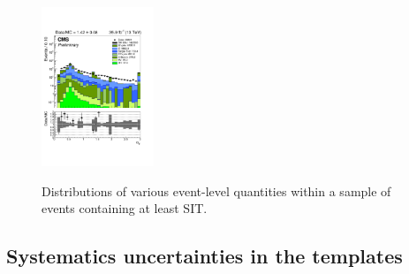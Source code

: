 \begin{figure}[h!]
\begin{center}
    \includegraphics[width=0.3\textwidth,page=12,trim=0 100 50 100,clip]{figures/SITV/Event/Event.pdf}\\
    \caption{Distributions of various event-level quantities within a
      sample of \mj events containing at least SIT.}
    \label{fig:dataMC_SITEvent_mu}
  \end{center} 
\end{figure}

\clearpage
\subsection{Systematics uncertainties in the \texorpdfstring{\HTmiss}{MHT} templates}
\label{app:mht}


